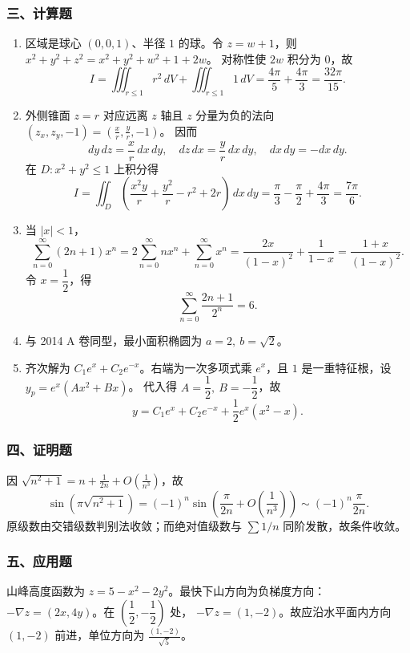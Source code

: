 \subsubsection*{三、计算题}
\begin{enumerate}
  \item 区域是球心 $(0,0,1)$、半径 $1$ 的球。令 $z=w+1$，则 \(\displaystyle x^2+y^2+z^2=x^2+y^2+w^2+1+2w\)。
  对称性使 $2w$ 积分为 $0$，故
  \[
  I=\iiint_{r\le1}r^2\,dV+\iiint_{r\le1}1\,dV
  =\frac{4\pi}{5}+\frac{4\pi}{3}=\frac{32\pi}{15}.
  \]
  \item 外侧锥面 $z=r$ 对应远离 $z$ 轴且 $z$ 分量为负的法向 \(\displaystyle (z_x,z_y,-1)=\left(\frac{x}{r},\frac{y}{r},-1\right)\)。
  因而
  \[
  dy\,dz=\frac{x}{r}\,dx\,dy,\quad dz\,dx=\frac{y}{r}\,dx\,dy,\quad dx\,dy=-dx\,dy.
  \]
  在 $D:x^2+y^2\le1$ 上积分得
  \[
  I=\iint_D\left(\frac{x^2y}{r}+\frac{y^2}{r}-r^2+2r\right)\,dx\,dy
  =\frac{\pi}{3}-\frac{\pi}{2}+\frac{4\pi}{3}
  =\frac{7\pi}{6}.
  \]
  \item 当 $|x|<1$，
  \[
  \sum_{n=0}^{\infty}(2n+1)x^n
  =2\sum_{n=0}^{\infty}nx^n+\sum_{n=0}^{\infty}x^n
  =\frac{2x}{(1-x)^2}+\frac1{1-x}
  =\frac{1+x}{(1-x)^2}.
  \]
  令 $x=\dfrac12$，得
  \[
  \sum_{n=0}^{\infty}\frac{2n+1}{2^n}=6.
  \]
  \item 与 2014 A 卷同型，最小面积椭圆为 \(\displaystyle a=2,\ b=\sqrt2\)。
  \item 齐次解为 $C_1e^x+C_2e^{-x}$。右端为一次多项式乘 $e^x$，且 $1$ 是一重特征根，设 \(\displaystyle y_p=e^x(Ax^2+Bx)\)。
  代入得 $A=\dfrac12,\ B=-\dfrac12$，故
  \[
  y=C_1e^x+C_2e^{-x}+\frac12e^x(x^2-x).
  \]
\end{enumerate}

\subsubsection*{四、证明题}
  因 \(\displaystyle \sqrt{n^2+1}=n+\frac1{2n}+O\!\left(\frac1{n^3}\right)\)，故
\[
\sin(\pi\sqrt{n^2+1})
=(-1)^n\sin\left(\frac{\pi}{2n}+O\!\left(\frac1{n^3}\right)\right)
\sim (-1)^n\frac{\pi}{2n}.
\]
原级数由交错级数判别法收敛；而绝对值级数与 $\sum 1/n$ 同阶发散，故条件收敛。

\subsubsection*{五、应用题}
  山峰高度函数为 $z=5-x^2-2y^2$。最快下山方向为负梯度方向：
  \(\displaystyle -\nabla z=(2x,4y)\)。在 $\left(\dfrac12,-\dfrac12\right)$ 处，
  \(\displaystyle -\nabla z=(1,-2)\)。故应沿水平面内方向 $(1,-2)$ 前进，单位方向为 \(\displaystyle \frac{(1,-2)}{\sqrt5}\)。

